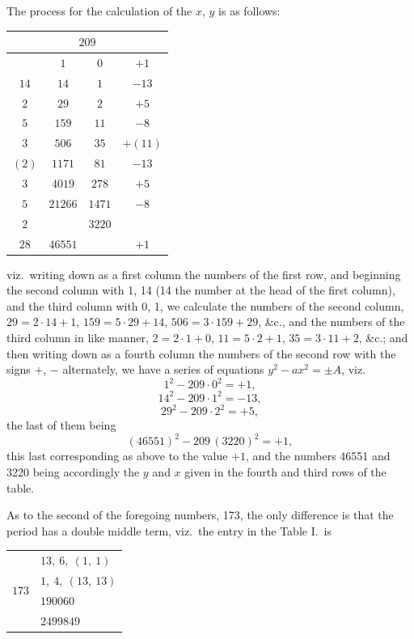 \documentclass[11pt]{article}
\begin{document}
The process for the calculation of the $x$, $y$ is as follows:
\begin{center}
\begin{tabular}{|c|c|c|c|}
\hline
\multicolumn{4}{|c|}{$209$} \\
\hline
 & $1$ & $0$ & $+ 1$ \\
$14$ & $14$ & $1$ & $-13$ \\
$2$ & $29$ & $2$ & $+ 5$ \\
$5$ & $159$ & $11$ & $- 8$ \\
$3$ & $506$ & $35$ & $+ (11)$ \\
$(2)$ & $1171$ & $81$ & $-13$ \\
$3$ & $4019$ & $278$ & $+ 5$ \\
$5$ & $21266$ & $1471$ & $- 8$ \\
$2$ & & $3220$ & \\
$28$ & $46551$ & & $+ 1$ \\
\hline
\end{tabular}
\end{center}
viz.\ writing down as a first column the numbers of the first row, and beginning the second column with 1, 14 (14 the number at the head of the first column), and the third column with 0, 1, we calculate the numbers of the second column, $29 = 2 \cdot 14 + 1$, $159 = 5 \cdot 29 + 14$, $506 = 3 \cdot 159 + 29$, \&c., and the numbers of the third column in like manner, $2 = 2 \cdot 1 + 0$, $11 = 5 \cdot 2 + 1$, $35 = 3 \cdot 11 + 2$, \&c.; and then writing down as a fourth column the numbers of the second row with the signs $+$, $-$ alternately, we have a series of equations $y^2 - ax^2 = \pm A$, viz.
\[
1^2 - 209 \cdot 0^2 = + 1,
\]
\[
14^2 - 209 \cdot 1^2 = - 13,
\]
\[
29^2 - 209 \cdot 2^2 = + 5,
\]
the last of them being
\[
(46551)^2 - 209\,(3220)^2 = + 1,
\]
this last corresponding as above to the value $+1$, and the numbers 46551 and 3220 being accordingly the $y$ and $x$ given in the fourth and third rows of the table.

As to the second of the foregoing numbers, 173, the only difference is that the period has a double middle term, viz.\ the entry in the Table I.\ is
\begin{center}
\begin{tabular}{c|l}
\multirow{4}{*}{$173$} & $13,\ 6,\ (1,\ 1)$ \\
 & $1,\ 4,\ (13,\ 13)$ \\
 & $190060$ \\
 & $2499849$ \\
\end{tabular}
\end{center}
\end{document}
